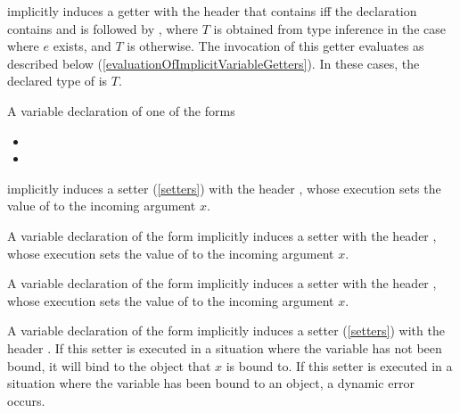 \documentclass[makeidx]{article}
\begin{document}
\noindent
implicitly induces a getter with the header that
contains \STATIC{} if{}f the declaration contains \STATIC{} and is followed by
,
where $T$ is obtained from type inference
in the case where $e$ exists,
and $T$ is \DYNAMIC{} otherwise.
The invocation of this getter evaluates as described below
(\ref{evaluationOfImplicitVariableGetters}).
In these cases, the declared type of \id{} is $T$.
\EndCase

\LMHash{}%
A variable declaration of one of the forms

\begin{itemize}
\item {}
\item {}
\end{itemize}

\noindent
implicitly induces a setter (\ref{setters}) with the header
,
whose execution sets the value of \id{} to the incoming argument $x$.

\LMHash{}%
A variable declaration of the form
implicitly induces a setter with the header
,
whose execution sets the value of \id{} to the incoming argument $x$.

\EndCase

\LMHash{}%
A variable declaration of the form
implicitly induces a setter with the header
,
whose execution sets the value of \id{} to the incoming argument $x$.

\EndCase

\LMHash{}%
A variable declaration of the form
implicitly induces a setter (\ref{setters}) with the header
.
If this setter is executed
in a situation where the variable \id{} has not been bound,
it will bind \id{} to the object that $x$ is bound to.
If this setter is executed
in a situation where the variable \id{} has been bound to an object,
a dynamic error occurs.
\EndCase
\end{document}
